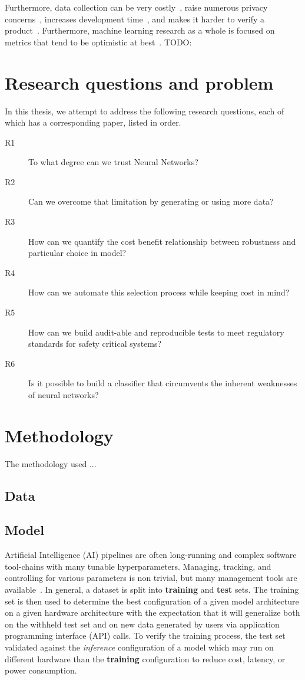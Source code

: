 Furthermore, data collection can be very costly~\cite{roh2019survey}, raise numerous privacy concerns~\cite{bloom2017self}, increases development time~\cite{lam2004new}, and makes it harder to verify a product~\cite{zirger1996effect}. Furthermore, machine learning research as a whole is focused on metrics that tend to be optimistic at best~\cite{madry2017towards}. TODO:

\section{Research questions and problem}
\label{sec:research-questions-and-problems}
In this thesis, we attempt to address the following research questions, each of which has a corresponding paper, listed in order.
\begin{description}
    \item[R1] To what degree can we trust Neural Networks?
    \item[R2] Can we overcome that limitation by generating or using more data?
    \item[R3] How can we quantify the cost benefit relationship between robustness and particular choice in model?
    \item[R4] How can we automate this selection process while keeping cost in mind?
    \item[R5] How can we build audit-able and reproducible tests to meet regulatory standards for safety critical systems?
    \item[R6] Is it possible to build a classifier that circumvents the inherent weaknesses of neural networks?
\end{description}

\section{Methodology}
\label{sec:methods}
The methodology used ...
\subsection{Data}
\label{subsec:methods-data}
\lipsum[1-3]
\subsection{Model}
\label{subsec:methods-model}
Artificial Intelligence (AI) pipelines are often long-running and complex software tool-chains with many tunable hyperparameters. Managing, tracking, and controlling for various parameters is non trivial, but many management tools are available~\cite{dvc, hydra, k8s}. In general, a dataset is split into \textbf{training} and \textbf{test} sets. The training set is then used to determine the best configuration of a given model architecture on a given hardware architecture with the expectation that it will generalize both on the withheld test set and on new data generated by users via application programming interface (API) calls. To verify the training process, the test set validated against the \textit{inference} configuration of a model which may run on different hardware than the \textbf{training} configuration to reduce cost, latency, or power consumption.
\lipsum[1-3]
